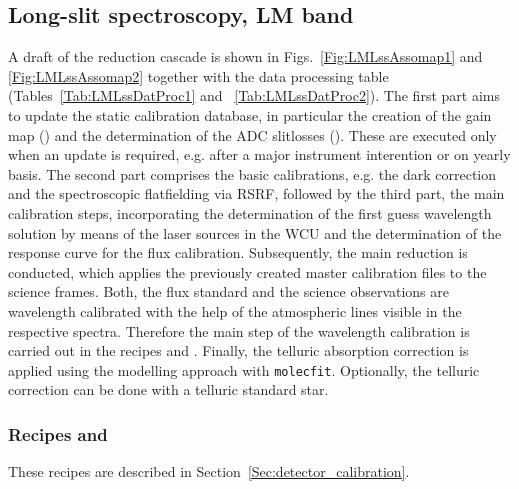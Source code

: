 \clearpage
\subsection{Long-slit spectroscopy, LM band}
\label{ssec:recipes_lss_lm}

A draft of the reduction cascade is shown in
Figs.~\ref{Fig:LMLssAssomap1} and \ref{Fig:LMLssAssomap2} together with the data processing table
(Tables~\ref{Tab:LMLssDatProc1} and ~\ref{Tab:LMLssDatProc2}). The first part aims to update the static calibration database, in particular the creation of the gain map (\hyperref[Sec:detector_calibration]{}) and the determination of the \ac{ADC} slitlosses (\hyperref[rec:metis_lm_adc_slitloss]{}). These are executed only when an update is required, e.g. after a major instrument interention or on yearly basis. The second part comprises the basic calibrations, e.g. the dark correction and the spectroscopic flatfielding via \ac{RSRF}, followed by the third part, the main calibration steps, incorporating the determination of the first guess wavelength solution by means of the laser sources in the \ac{WCU} and the determination of the response curve for the flux calibration. Subsequently, the main reduction is conducted, which applies the previously created master calibration files to the science frames. Both, the flux standard and the science observations are wavelength calibrated with the help of the atmospheric lines visible in the respective spectra. Therefore the main step of the wavelength calibration is carried out in the recipes \hyperref[rec:metis_lm_lss_std]{} and \hyperref[rec:metis_lm_lss_sci]{}. Finally, the telluric absorption correction is applied using the modelling approach with \texttt{molecfit}. Optionally, the telluric correction can be done with a telluric standard star.


\subsubsection{Recipes  and }
These recipes are described in Section~\ref{Sec:detector_calibration}.

